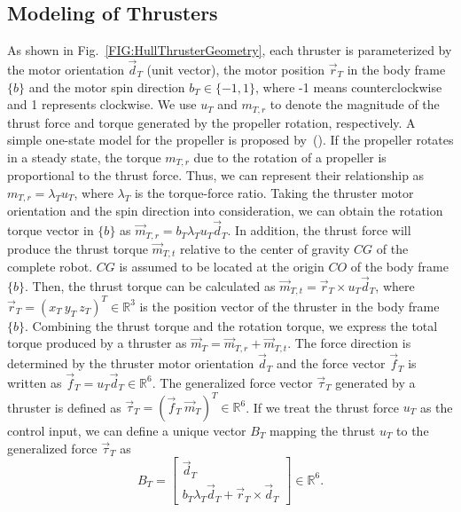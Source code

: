 \subsection{Modeling of Thrusters}
As shown in Fig.~\ref{FIG:HullThrusterGeometry}, each thruster is parameterized by the motor orientation $\vec{d}_{T}$ (unit vector), the motor position $\vec{r}_{T}$ in the body frame $\lbrace b \rbrace$ and the motor spin direction $b_{T}\in \lbrace -1,1 \rbrace$, where -1 means counterclockwise and 1 represents clockwise. We use $u_{T}$ and $m_{T,r}$ to denote the magnitude of the thrust force and torque generated by the propeller rotation, respectively.
A simple one-state model for the propeller is proposed by~(\cite{c8}). If the propeller rotates in a steady state, the torque $m_{T,r}$ due to the rotation of a propeller is proportional to the thrust force. Thus, we can represent their relationship as $ m_{T,r}=\lambda_{T}u_{T}$, where $\lambda_{T}$ is the torque-force ratio. Taking the thruster motor orientation and the spin direction into consideration, we can obtain the rotation torque vector in $\lbrace b \rbrace$ as $\vec{m}_{T,r}=b_{T}\lambda_{T}u_{T}\vec{d}_{T}$. In addition, the thrust force will produce the thrust torque $\vec{m}_{T,t}$ relative to the center of gravity $CG$ of the complete robot. $CG$ is assumed to be located at the origin $CO$ of the body frame $\lbrace b \rbrace$. Then, the thrust torque can be calculated as $\vec{m}_{T,t}=\vec{r}_{T} \times u_{T}\vec{d}_{T}$, where $\vec{r}_{T} = (x_{T}~y_{T}~z_{T})^{T} \in \mathbb{R}^{3}$ is the position vector of the thruster in the body frame $\lbrace b \rbrace$. Combining the thrust torque and the rotation torque, we express the total torque produced by a thruster as $\vec{m}_{T}=\vec{m}_{T,r}+\vec{m}_{T,t}$. The force direction is determined by the thruster motor orientation $\vec{d}_{T}$ and the force vector $\vec{f}_{T}$ is written as $\vec{f}_{T}=u_{T}\vec{d}_{T} \in \mathbb{R}^{6}$. The generalized force vector $\vec{\tau}_{T}$ generated by a thruster is defined as $\vec{\tau}_{T}=(\vec{f}_{T}~\vec{m}_{T})^{T}\in \mathbb{R}^{6}$. If we treat the thrust force $u_{T}$ as the control input, we can define a unique vector $B_{T}$ mapping the thrust $u_{T}$ to the generalized force $\vec{\tau}_{T}$ as 
\begin{equation}
B_{T}=\begin{bmatrix}
\vec{d}_{T} \\
b_{T}\lambda_{T}\vec{d}_{T}+\vec{r}_{T} \times \vec{d}_{T}
\end{bmatrix} \in \mathbb{R}^{6}.
\end{equation}  
